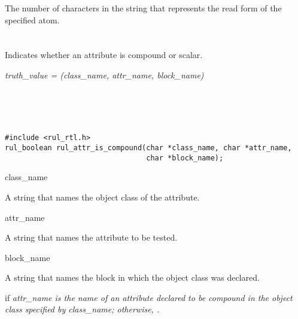 The number of characters in the string that represents the read form
of the specified atom.

\begin{seealso}

\end{seealso}

\section*{}

    Indicates whether an attribute is compound
    or scalar.

\Syntax

\it{truth\_value} = (\it{class\_name},
\it{attr\_name}, \it{block\_name})

\begin{args}
   \\
   \\
   \\
\end{args}

\CBinding

\begin{verbatim}
#include <rul_rtl.h>
rul_boolean rul_attr_is_compound(char *class_name, char *attr_name,
                                 char *block_name);
\end{verbatim}

\begin{arguments}
\item[class\_name]

  A string that names the object class of the attribute.

\item[attr\_name]

  A string that names the attribute to be tested.

\item[block\_name]

  A string that names the block in which the object class was
  declared.
\end{arguments}

\ReturnValue

 if \it{attr\_name} is the name of an attribute declared to be compound
in the object class specified by \it{class\_name}; otherwise, .


